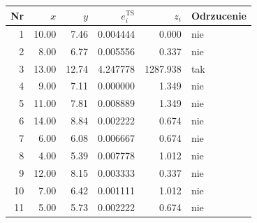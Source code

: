 \begin{tabular}{rrrrrl}
\toprule
Nr & $x$ & $y$ & $e_i^{\mathrm{TS}}$ & $z_i$ & Odrzucenie \\
\midrule
1 & \num{10.00} & \num{7.46} & \num{0.004444} & \num{0.000} & nie \\
2 & \num{8.00} & \num{6.77} & \num{0.005556} & \num{0.337} & nie \\
3 & \num{13.00} & \num{12.74} & \num{4.247778} & \num{1287.938} & tak \\
4 & \num{9.00} & \num{7.11} & \num{0.000000} & \num{1.349} & nie \\
5 & \num{11.00} & \num{7.81} & \num{0.008889} & \num{1.349} & nie \\
6 & \num{14.00} & \num{8.84} & \num{0.002222} & \num{0.674} & nie \\
7 & \num{6.00} & \num{6.08} & \num{0.006667} & \num{0.674} & nie \\
8 & \num{4.00} & \num{5.39} & \num{0.007778} & \num{1.012} & nie \\
9 & \num{12.00} & \num{8.15} & \num{0.003333} & \num{0.337} & nie \\
10 & \num{7.00} & \num{6.42} & \num{0.001111} & \num{1.012} & nie \\
11 & \num{5.00} & \num{5.73} & \num{0.002222} & \num{0.674} & nie \\
\bottomrule
\end{tabular}
